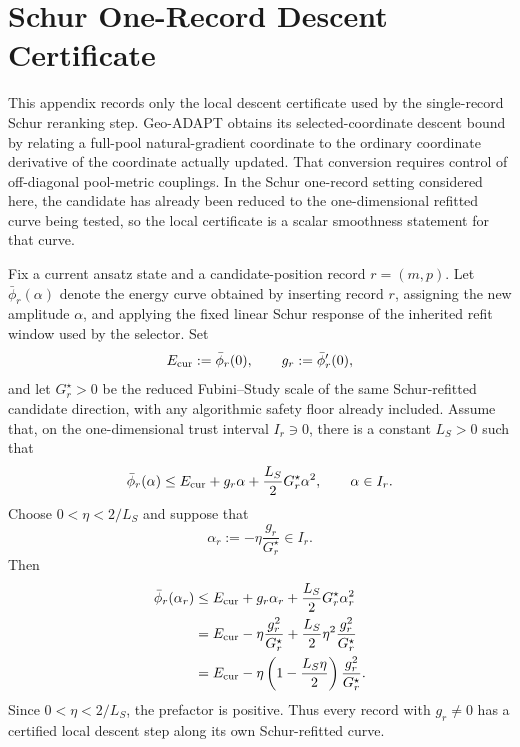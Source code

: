 \documentclass[
  reprint,
  amsmath,
  amssymb,
  aps,
  pra,
  nofootinbib,
  superscriptaddress,
  floatfix
]{revtex4-2}
\begin{document}
\section{Schur One-Record Descent Certificate}
\label{app:schur_one_record_descent}
\label{app:schur_convergence}

This appendix records only the local descent certificate used by the
single-record Schur reranking step. Geo-ADAPT \cite{Sohail2026GeoADAPT}
obtains its selected-coordinate descent bound by relating a full-pool
natural-gradient coordinate to the ordinary coordinate derivative of the
coordinate actually updated. That conversion requires control of
off-diagonal pool-metric couplings. In the Schur one-record setting
considered here, the candidate has already been reduced to the
one-dimensional refitted curve being tested, so the local certificate is
a scalar smoothness statement for that curve.

Fix a current ansatz state and a candidate-position record \(r=(m,p)\).
Let \(\bar\phi_r(\alpha)\) denote the energy curve obtained by inserting
record \(r\), assigning the new amplitude \(\alpha\), and applying the
fixed linear Schur response of the inherited refit window used by the
selector. Set
\[
E_{\rm cur}:=\bar\phi_r(0),
\qquad
g_r:=\bar\phi_r'(0),
\]
and let \(G_r^\star>0\) be the reduced Fubini--Study scale of the same
Schur-refitted candidate direction, with any algorithmic safety floor
already included. Assume that, on the one-dimensional trust interval
\(I_r\ni0\), there is a constant \(L_S>0\) such that
\begin{equation}
\bar\phi_r(\alpha)
\le
E_{\rm cur}
+
g_r\alpha
+
\frac{L_S}{2}G_r^\star\alpha^2,
\qquad
\alpha\in I_r .
\label{eq:schur_scalar_smoothness}
\end{equation}
Choose \(0<\eta<2/L_S\) and suppose that
\[
\alpha_r:=-\eta\frac{g_r}{G_r^\star}\in I_r .
\]
Then
\begin{align}
\bar\phi_r(\alpha_r)
&\le
E_{\rm cur}
+
g_r\alpha_r
+
\frac{L_S}{2}G_r^\star\alpha_r^2
\nonumber\\
&=
E_{\rm cur}
-
\eta\frac{g_r^2}{G_r^\star}
+
\frac{L_S}{2}\eta^2\frac{g_r^2}{G_r^\star}
\nonumber\\
&=
E_{\rm cur}
-
\eta\left(1-\frac{L_S\eta}{2}\right)
\frac{g_r^2}{G_r^\star}.
\label{eq:schur_one_record_descent}
\end{align}
Since \(0<\eta<2/L_S\), the prefactor is positive. Thus every record
with \(g_r\neq0\) has a certified local descent step along its own
Schur-refitted curve.
\end{document}
